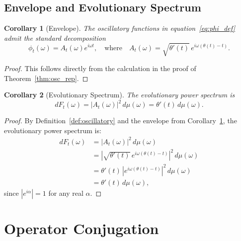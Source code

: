 \documentclass[11pt]{article}
\newtheorem{corollary}{Corollary}
\begin{document}
\subsection{Envelope and Evolutionary Spectrum}

\begin{corollary}[Envelope]\label{cor:envelope}
The oscillatory functions in equation~\eqref{eq:phi_def} admit the standard decomposition
\begin{equation}\label{eq:envelope}
    \phi_t(\omega)=A_t(\omega)e^{i\omega t},
    \quad\text{where}\quad
    A_t(\omega)=\sqrt{\theta'(t)}\,e^{i\omega(\theta(t)-t)}.
\end{equation}
\end{corollary}

\begin{proof}
This follows directly from the calculation in the proof of Theorem~\ref{thm:osc_rep}.
\end{proof}

\begin{corollary}[Evolutionary Spectrum]\label{cor:evolving_spec}
The evolutionary power spectrum is
\begin{equation}\label{eq:evolutionary_spec}
    dF_t(\omega)=\lvert A_t(\omega)\rvert^2\,d\mu(\omega)=\theta'(t)\,d\mu(\omega).
\end{equation}
\end{corollary}

\begin{proof}
By Definition~\ref{def:oscillatory} and the envelope from Corollary~\ref{cor:envelope}, the evolutionary power spectrum is:
\begin{align}
    dF_t(\omega) &= \lvert A_t(\omega)\rvert^2\,d\mu(\omega)\\
    &= \left|\sqrt{\theta'(t)}\,e^{i\omega(\theta(t)-t)}\right|^2\,d\mu(\omega)\\
    &= \theta'(t)\,\left|e^{i\omega(\theta(t)-t)}\right|^2\,d\mu(\omega)\\
    &= \theta'(t)\,d\mu(\omega),
\end{align}
since $|e^{i\alpha}| = 1$ for any real $\alpha$.
\end{proof}

\section{Operator Conjugation}\label{sec:conjugation}
\end{document}
